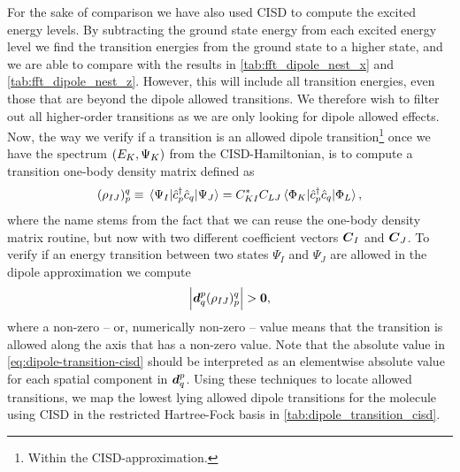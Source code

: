        For the sake of comparison we have also used CISD to compute the excited
        energy levels.
        By subtracting the ground state energy from each excited energy level we
        find the transition energies from the ground state to a higher state,
        and we are able to compare with the results in
        \autoref{tab:fft_dipole_nest_x} and \autoref{tab:fft_dipole_nest_z}.
        However, this will include all transition energies, even those that are
        beyond the dipole allowed transitions.
        We therefore wish to filter out all higher-order transitions as we are
        only looking for dipole allowed effects.
        Now, the way we verify if a transition is an allowed dipole
        transition\footnote{%
            Within the CISD-approximation.
        }
        once we have the spectrum $(E_K, \Psi_K)$ from the
        CISD-Hamiltonian, is to compute a transition one-body density matrix
        defined as
        \begin{align}
            (\rho_{IJ})^{q}_{p}
            \equiv \mel*{\Psi_I}{
                \hat{c}_{p}^{\dagger}
                \hat{c}_{q}
            }{\Psi_J}
            = C^{*}_{KI} C_{LJ}
            \mel*{\Phi_{K}}{
                \hat{c}_{p}^{\dagger}
                \hat{c}_{q}
            }{\Phi_L},
        \end{align}
        where the name stems from the fact that we can reuse the one-body
        density matrix routine, but now with two different coefficient vectors
        $\boldsymbol{C}_I$ and $\boldsymbol{C}_J$.
        To verify if an energy transition between two states $\Psi_I$ and
        $\Psi_J$ are allowed in the dipole approximation we compute
        \begin{align}
            \abs{\boldsymbol{d}^{p}_{q} (\rho_{IJ})^{q}_{p}}
            > \boldsymbol{0},
            \label{eq:dipole-transition-cisd}
        \end{align}
        where a non-zero -- or, numerically non-zero -- value means that the
        transition is allowed along the axis that has a non-zero value.
        Note that the absolute value in \autoref{eq:dipole-transition-cisd}
        should be interpreted as an elementwise absolute value for each spatial
        component in $\boldsymbol{d}^{p}_{q}$.
        Using these techniques to locate allowed transitions, we map the
        lowest lying allowed dipole transitions for the  molecule using
        CISD in the restricted Hartree-Fock basis in
        \autoref{tab:dipole_transition_cisd}.
